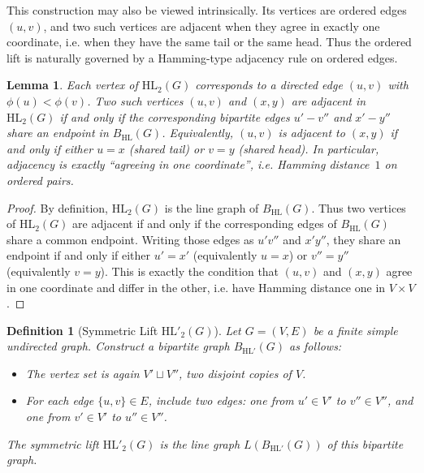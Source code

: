 \documentclass[11pt]{article}
\newtheorem{lemma}{Lemma}
\newtheorem{definition}{Definition}
\newcommand{\HL}{\mathrm{HL}}
\theoremstyle{plain}
\begin{document}
This construction may also be viewed intrinsically. Its vertices are ordered edges \((u,v)\), and
two such vertices are adjacent when they agree in exactly one coordinate, i.e. when they have the
same tail or the same head. Thus the ordered lift is naturally governed by a Hamming-type
adjacency rule on ordered edges.

\begin{lemma}
Each vertex of $\mathrm{HL}_2(G)$ corresponds to a directed edge $(u,v)$ with $\phi(u)<\phi(v)$.
Two such vertices $(u,v)$ and $(x,y)$ are adjacent in $\mathrm{HL}_2(G)$ if and only if the
corresponding bipartite edges $u'\!-\!v''$ and $x'\!-\!y''$ share an endpoint in $B_{\mathrm{HL}}(G)$.
Equivalently, $(u,v)$ is adjacent to $(x,y)$ if and only if either $u=x$ (shared tail) or $v=y$
(shared head). In particular, adjacency is exactly ``agreeing in one coordinate'', i.e. Hamming
distance~$1$ on ordered pairs.
\end{lemma}


\begin{proof}
By definition, $\HL_2(G)$ is the line graph of $B_{\HL}(G)$. Thus two vertices of $\HL_2(G)$
are adjacent if and only if the corresponding edges of $B_{\HL}(G)$ share a common endpoint.
Writing those edges as $u'v''$ and $x'y''$, they share an endpoint if and only if either
$u'=x'$ (equivalently $u=x$) or $v''=y''$ (equivalently $v=y$). This is exactly the
condition that $(u,v)$ and $(x,y)$ agree in one coordinate and differ in the other, i.e.
have Hamming distance one in $V\times V$.
\end{proof}



\begin{definition}[Symmetric Lift \( \mathrm{HL}'_2(G) \)]\label{def:symmetric-lift}
Let \( G = (V, E) \) be a finite simple undirected graph. Construct a bipartite graph \( B_{\mathrm{HL}'}(G) \) as follows:
\begin{itemize}
    \item The vertex set is again \( V' \sqcup V'' \), two disjoint copies of \( V \).
    \item For each edge \( \{u,v\} \in E \), include two edges: one from \( u' \in V' \) to \( v'' \in V'' \), and one from \( v' \in V' \) to \( u'' \in V'' \).
\end{itemize}
The symmetric lift \( \mathrm{HL}'_2(G) \) is the line graph \( L(B_{\mathrm{HL}'}(G)) \) of this bipartite graph.
\end{definition}
\end{document}
